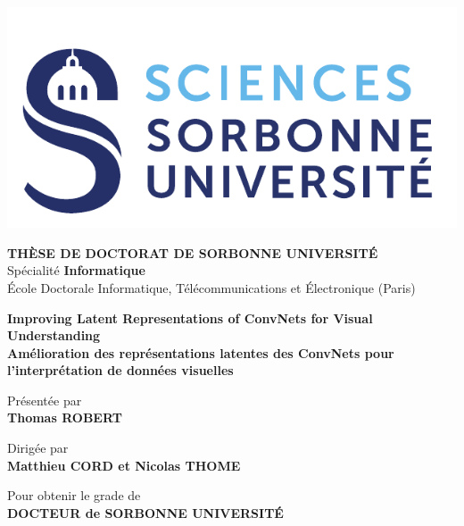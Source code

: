 \begin{titlepage}

\vspace*{-2.5cm}
\includegraphics[height=0.15\columnwidth]{images/sorbonne}
\vspace*{0.5cm}

\begin{center}

{\large \textbf{T\normalsize{HÈSE DE}\large{} D\normalsize{OCTORAT DE}\large{} S\normalsize{ORBONNE}\large{} U\normalsize{NIVERSITÉ}}}\\
Spécialité \textbf{Informatique}\\ 
École Doctorale Informatique, Télécommunications et Électronique (Paris)

\vspace*{1.5cm}

{\Large \textbf{Improving Latent Representations of ConvNets \newline for Visual Understanding}} \\[0.5em]
{\large \textbf{Amélioration des représentations latentes des ConvNets \newline pour l'interprétation de données visuelles}}

\vspace*{1.2cm}

Présentée par\\
{\large \textbf{Thomas {ROBERT}}}

\vspace*{2mm}

Dirigée par\\
\textbf{Matthieu {CORD} et Nicolas {THOME}}

\vspace*{5mm}

Pour obtenir le grade de \ \\
\textbf{DOCTEUR de SORBONNE UNIVERSITÉ} \ \\

\vspace*{5mm}

\end{center}

\newcommand{\affil}[1]{\multicolumn{2}{@{\hskip 18pt}l@{}}{\small \itshape \textcolor{mygray}{#1}}}


\end{titlepage}
